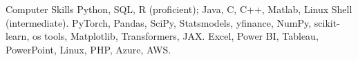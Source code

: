 \begin{rubric}{Computer Skills}
\entry*[Programming]
	Python, SQL, R (proficient); Java, C, C++, Matlab, Linux Shell (intermediate).
\entry*[Packages]
	PyTorch, Pandas, SciPy, Statsmodels, yfinance, NumPy, scikit-learn, os tools, Matplotlib, Transformers, JAX.
	Excel, Power BI, Tableau, PowerPoint, Linux, PHP, Azure, AWS.
\end{rubric}
